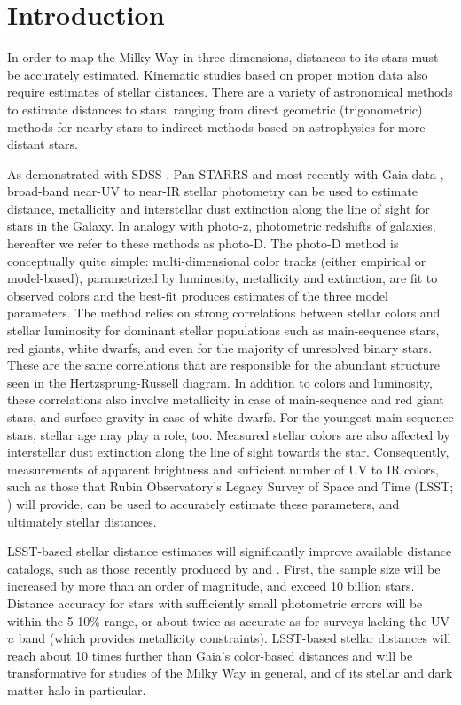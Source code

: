 \section{Introduction} \label{sec:intro}


In order to map the Milky Way in three dimensions, distances to its stars must be accurately  estimated.
Kinematic studies based on proper motion data also require estimates of stellar distances.  There are a variety
of astronomical methods to estimate distances to stars, ranging from direct geometric (trigonometric) methods
for nearby stars to indirect methods based on astrophysics for more distant stars.

As demonstrated with SDSS \citep{2008ApJ...673..864J, 2008ApJ...684..287I}, Pan-STARRS \citep{2014ApJ...783..114G, green_3d_2019} and most recently with
Gaia data \citep{bailer-jones_estimating_2021}, broad-band near-UV to near-IR stellar photometry can be used 
to estimate distance, metallicity and interstellar dust extinction along the line of sight for stars in the Galaxy.
In analogy with photo-z, photometric redshifts of galaxies, hereafter we refer to these methods as photo-D. 
The photo-D method is conceptually quite simple: multi-dimensional color tracks (either empirical or model-based),
parametrized by luminosity, metallicity and extinction, are fit to observed colors and the best-fit produces estimates
of the three model parameters. The method relies on strong correlations between stellar colors and
stellar luminosity for dominant stellar populations such as main-sequence stars, red giants, white dwarfs, and even
for the majority of unresolved binary stars. These are the same correlations that are responsible for the abundant
structure seen in the Hertzsprung-Russell diagram. In addition to colors and luminosity, these correlations
also involve metallicity in case of main-sequence and red giant stars, and surface gravity in case of white dwarfs.
For the youngest main-sequence stars, stellar age may play a role, too. Measured stellar colors are also affected
by interstellar dust extinction along the line of sight towards the star. Consequently, measurements of apparent
brightness and sufficient number of UV to IR colors, such as those that Rubin Observatory's Legacy Survey of Space
and Time (LSST; \citealt{2019ApJ...873..111I}) will provide, can be used to accurately estimate these parameters,
and ultimately stellar distances.

LSST-based stellar distance estimates will significantly improve available distance catalogs, such as those recently produced by \cite{green_3d_2019}
and \cite{bailer-jones_estimating_2021}. First, the sample size will be increased by more than an order of magnitude, and exceed 10 billion stars.
Distance accuracy for stars with sufficiently small photometric errors will be within the 5-10\% range, or about twice
as accurate as for surveys lacking the UV $u$ band (which provides metallicity constraints). LSST-based stellar distances
will reach about 10 times further than Gaia’s color-based distances and will be transformative for studies of the
Milky Way in general, and of its stellar and dark matter halo in particular. 

